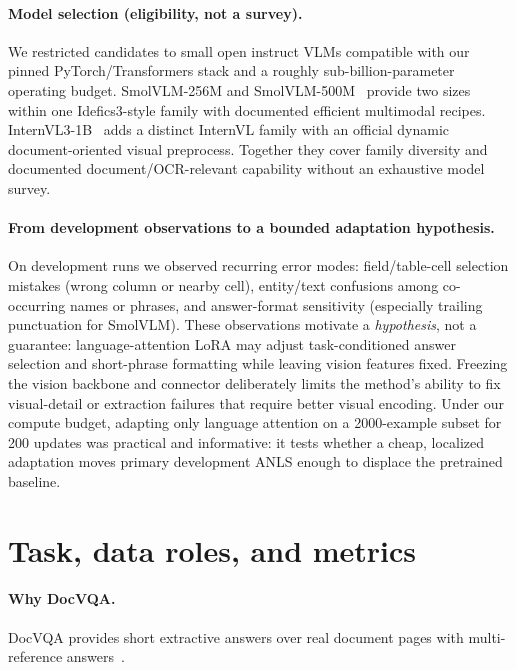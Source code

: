 \documentclass[11pt,a4paper]{article}
\begin{document}
\paragraph{Model selection (eligibility, not a survey).}
We restricted candidates to small open instruct VLMs compatible with our pinned PyTorch/Transformers stack and a roughly sub-billion-parameter operating budget.
SmolVLM-256M and SmolVLM-500M~\citep{marafioti2025smolvlm} provide two sizes within one Idefics3-style family with documented efficient multimodal recipes.
InternVL3-1B~\citep{zhu2025internvl3,opengvlab2025internvl3_1b_card} adds a distinct InternVL family with an official dynamic document-oriented visual preprocess.
Together they cover family diversity and documented document/OCR-relevant capability without an exhaustive model survey.

\paragraph{From development observations to a bounded adaptation hypothesis.}
On development runs we observed recurring error modes: field/table-cell selection mistakes (wrong column or nearby cell), entity/text confusions among co-occurring names or phrases, and answer-format sensitivity (especially trailing punctuation for SmolVLM).
These observations motivate a \emph{hypothesis}, not a guarantee: language-attention LoRA may adjust task-conditioned answer selection and short-phrase formatting while leaving vision features fixed.
Freezing the vision backbone and connector deliberately limits the method's ability to fix visual-detail or extraction failures that require better visual encoding.
Under our compute budget, adapting only language attention on a 2000-example subset for 200 updates was practical and informative: it tests whether a cheap, localized adaptation moves primary development ANLS enough to displace the pretrained baseline.

\section{Task, data roles, and metrics}

\paragraph{Why DocVQA.}
DocVQA provides short extractive answers over real document pages with multi-reference answers~\citep{mathew2021docvqa}.
\end{document}
